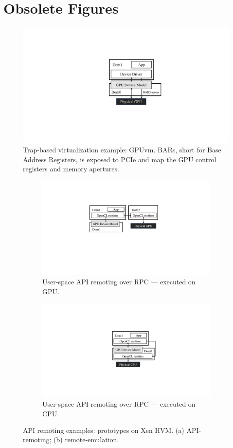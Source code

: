 \section{Obsolete Figures}

\begin{figure}[!th]
	\centering
	\includegraphics[width=.5\columnwidth,trim={14cm 6.2cm 11cm 5cm},clip]{images/gpuvm/gpuvm_basic.pdf}
	\caption{{\footnotesize Trap-based virtualization example: GPUvm. BARs, short for Base Address Registers, is exposed to PCIe and map the GPU control registers and  memory apertures.}}
	\label{fig_gpuvm_basic}
\end{figure}


\begin{figure}[!th]
	\centering
	\begin{subfigure}{.8\columnwidth}
		\centering
		\includegraphics[width=\columnwidth,trim={9cm 8.5cm 10cm 4cm},clip]{images/gpuvm/gpuvm_api.pdf}
		\caption{{\footnotesize User-space API remoting over RPC --- executed on GPU.}}
		\label{fig_gpuvm_api}
	\end{subfigure}\hfill
	\begin{subfigure}{.75\columnwidth}
		\centering
		\includegraphics[width=.6\columnwidth,trim={14cm 6cm 11cm 5cm},clip]{images/gpuvm/gpuvm_cpu.pdf}
		\caption{{\footnotesize User-space API remoting over RPC --- executed on CPU.}}
		\label{fig_gpuvm_cpu}
	\end{subfigure}
	\caption{{\footnotesize API remoting examples: prototypes on Xen HVM. (a) API-remoting; (b) remote-emulation.}}
	\label{fig:api_remote}
\end{figure}
